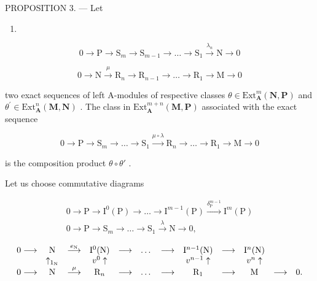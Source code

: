 PROPOSITION 3. — Let

\begin{enumerate}
\def\labelenumi{(\arabic{enumi})}
\setcounter{enumi}{5}
\tightlist
\item
\end{enumerate}

\[
0 \rightarrow \mathrm{P} \rightarrow \mathrm{S} _ {m} \rightarrow \mathrm{S} _ {m - 1} \rightarrow \dots \rightarrow \mathrm{S} _ {1} \stackrel {\lambda_ {n}} {\rightarrow} \mathrm{N} \rightarrow 0\tag{7}
\]

\[
0 \rightarrow \mathrm{N} \xrightarrow {\mu} \mathrm{R} _ {n} \rightarrow \mathrm{R} _ {n - 1} \rightarrow \dots \rightarrow \mathrm{R} _ {1} \rightarrow \mathrm{M} \rightarrow 0
\]

two exact sequences of left A-modules of respective classes \(\theta\in\mathrm{Ext}_{\mathbf{A}}^{m}(\mathbf{N},\mathbf{P})\) and \(\theta^{\prime}\in\mathrm{Ext}_{\mathbf{A}}^{n}(\mathbf{M},\mathbf{N})\) . The class in \(\mathrm{Ext}_{\mathbf{A}}^{m+n}(\mathbf{M},\mathbf{P})\) associated with the exact sequence

\[
0 \to \mathrm{P} \to \mathrm{S} _ {m} \to \dots \to \mathrm{S} _ {1} \xrightarrow {\mu \circ \lambda} \mathrm{R} _ {n} \to \dots \to \mathrm{R} _ {1} \to \mathrm{M} \to 0\tag{8}
\]

is the composition product \(\theta\circ\theta'\) .

Let us choose commutative diagrams

\[
\begin{array}{c} 0 \longrightarrow \mathrm{P} \longrightarrow \mathrm{I} ^ {0} (\mathrm{P}) \longrightarrow \dots \longrightarrow \mathrm{I} ^ {m - 1} (\mathrm{P}) \xrightarrow {\delta_ {\mathrm{P}} ^ {m - 1}} \mathrm{I} ^ {m} (\mathrm{P}) \\ 0 \longrightarrow \mathrm{P} \longrightarrow \mathrm{S} _ {m} \longrightarrow \dots \longrightarrow \mathrm{S} _ {1} \xrightarrow {\lambda} \mathrm{N} \longrightarrow 0, \end{array}
\]

\[
\begin{array}{c c c c c c c c c c c c} 0 \longrightarrow & \mathrm{N} & \stackrel {{e _ {\mathrm{N}}}} {{\longrightarrow}} & \mathrm{I} ^ {0} (\mathrm{N}) & \longrightarrow & \dots & \longrightarrow & \mathrm{I} ^ {n - 1} (\mathrm{N}) & \longrightarrow & \mathrm{I} ^ {n} (\mathrm{N}) \\ & \uparrow_ {1 _ {\mathrm{N}}} & & v ^ {0} \uparrow & & & & v ^ {n - 1} \uparrow & & v ^ {n} \uparrow \\ 0 \longrightarrow & \mathrm{N} & \stackrel {{\mu}} {{\longrightarrow}} & \mathrm{R} _ {n} & \longrightarrow & \dots & \longrightarrow & \mathrm{R} _ {1} & \longrightarrow & \mathrm{M} & \longrightarrow & 0. \end{array}
\]

